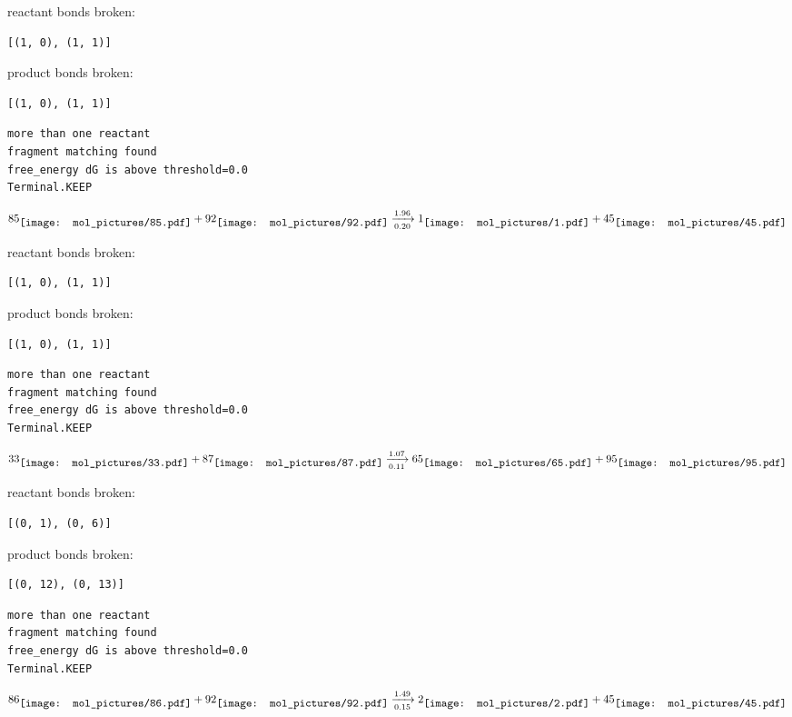 \documentclass{article}
\begin{document}
reactant bonds broken:\begin{verbatim}
[(1, 0), (1, 1)]
\end{verbatim}
product bonds broken:\begin{verbatim}
[(1, 0), (1, 1)]
\end{verbatim}




\vspace{1cm}
\begin{verbatim}
more than one reactant
fragment matching found
free_energy dG is above threshold=0.0
Terminal.KEEP
\end{verbatim}
$$
85
\raisebox{-.5\height}{\texttt{[image: mol\_pictures/85.pdf]}}
+
92
\raisebox{-.5\height}{\texttt{[image: mol\_pictures/92.pdf]}}
\xrightarrow[0.20]{1.96}
1
\raisebox{-.5\height}{\texttt{[image: mol\_pictures/1.pdf]}}
+
45
\raisebox{-.5\height}{\texttt{[image: mol\_pictures/45.pdf]}}
$$


reactant bonds broken:\begin{verbatim}
[(1, 0), (1, 1)]
\end{verbatim}
product bonds broken:\begin{verbatim}
[(1, 0), (1, 1)]
\end{verbatim}




\vspace{1cm}
\begin{verbatim}
more than one reactant
fragment matching found
free_energy dG is above threshold=0.0
Terminal.KEEP
\end{verbatim}
$$
33
\raisebox{-.5\height}{\texttt{[image: mol\_pictures/33.pdf]}}
+
87
\raisebox{-.5\height}{\texttt{[image: mol\_pictures/87.pdf]}}
\xrightarrow[0.11]{1.07}
65
\raisebox{-.5\height}{\texttt{[image: mol\_pictures/65.pdf]}}
+
95
\raisebox{-.5\height}{\texttt{[image: mol\_pictures/95.pdf]}}
$$


reactant bonds broken:\begin{verbatim}
[(0, 1), (0, 6)]
\end{verbatim}
product bonds broken:\begin{verbatim}
[(0, 12), (0, 13)]
\end{verbatim}




\vspace{1cm}
\begin{verbatim}
more than one reactant
fragment matching found
free_energy dG is above threshold=0.0
Terminal.KEEP
\end{verbatim}
$$
86
\raisebox{-.5\height}{\texttt{[image: mol\_pictures/86.pdf]}}
+
92
\raisebox{-.5\height}{\texttt{[image: mol\_pictures/92.pdf]}}
\xrightarrow[0.15]{1.49}
2
\raisebox{-.5\height}{\texttt{[image: mol\_pictures/2.pdf]}}
+
45
\raisebox{-.5\height}{\texttt{[image: mol\_pictures/45.pdf]}}
$$
\end{document}
